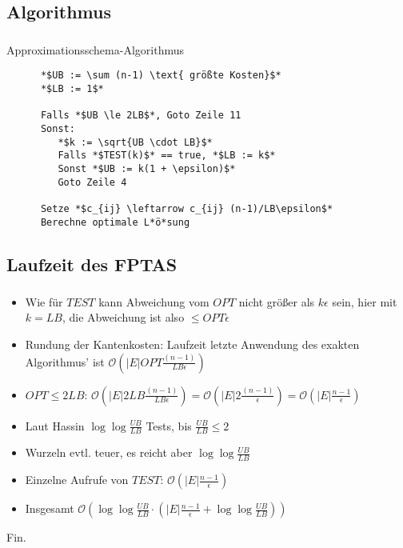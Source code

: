 \documentclass{beamer}
\begin{document}
\subsection{Algorithmus}

\begin{frame}[fragile]
   \frametitle{\insertsection}
   \framesubtitle{\insertsubsection}
   \begin{block}{Approximationsschema-Algorithmus}
      \begin{lstlisting}
      *$UB := \sum (n-1) \text{ größte Kosten}$*
      *$LB := 1$*

      Falls *$UB \le 2LB$*, Goto Zeile 11
      Sonst:
         *$k := \sqrt{UB \cdot LB}$*
         Falls *$TEST(k)$* == true, *$LB := k$*
         Sonst *$UB := k(1 + \epsilon)$*
         Goto Zeile 4

      Setze *$c_{ij} \leftarrow c_{ij} (n-1)/LB\epsilon$*
      Berechne optimale L*ö*sung
      \end{lstlisting}
   \end{block}
\end{frame}

\subsection{Laufzeit des FPTAS}
\begin{frame}
   \frametitle{\insertsection}
   \framesubtitle{\insertsubsection}
   \begin{itemize}[<+->]
      \item Wie für $TEST$ kann Abweichung vom $OPT$ nicht größer
         als $k\epsilon$ sein, hier mit $k=LB$, die Abweichung ist also $\le
         OPT\epsilon$
      \item Rundung der Kantenkosten: Laufzeit letzte Anwendung
         des exakten Algorithmus' ist $\mathcal{O}\left(|E| OPT\frac{(n-1)}{LB\epsilon}\right)$
      \item $OPT \le 2LB$: $\mathcal{O}(|E| 2LB\frac{(n-1)}{LB\epsilon})=\mathcal{O}(|E|
         2\frac{(n-1)}{\epsilon})=\mathcal{O}\left(|E|\frac{n-1}{\epsilon}\right)$
      \item Laut Hassin $\log{\log{\frac{UB}{LB}}}$ Tests, bis $\frac{UB}{LB} \le 2$
         \earth
      \item Wurzeln evtl. teuer, es reicht aber $\log{\log{\frac{UB}{LB}}}$ \earth
      \item Einzelne Aufrufe von $TEST$: $\mathcal{O}\left(|E|\frac{n-1}{\epsilon}\right)$
      \item Insgesamt $\mathcal{O}(\log\log{\frac{UB}{LB}\cdot(|E|\frac{n-1}{\epsilon} +
         \log\log{\frac{UB}{LB}})})$
   \end{itemize}
\end{frame}

\begin{frame}
   \centerline{Fin.}
\end{frame}
\end{document}
